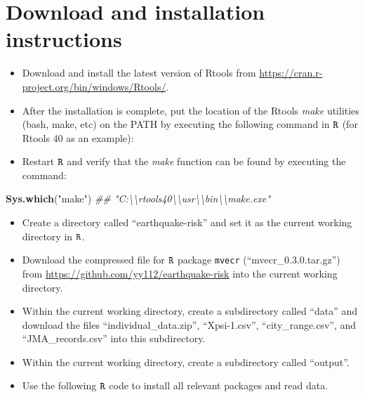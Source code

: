 \documentclass[
]{article}
\newenvironment{Shaded}{\begin{snugshade}}{\end{snugshade}}
\newcommand{\CharTok}[1]{\textcolor[rgb]{0.31,0.60,0.02}{#1}}
\newcommand{\CommentTok}[1]{\textcolor[rgb]{0.56,0.35,0.01}{\textit{#1}}}
\newcommand{\DataTypeTok}[1]{\textcolor[rgb]{0.13,0.29,0.53}{#1}}
\newcommand{\KeywordTok}[1]{\textcolor[rgb]{0.13,0.29,0.53}{\textbf{#1}}}
\newcommand{\NormalTok}[1]{#1}
\newcommand{\StringTok}[1]{\textcolor[rgb]{0.31,0.60,0.02}{#1}}
\providecommand{\tightlist}{%
  \setlength{\itemsep}{0pt}\setlength{\parskip}{0pt}}
\begin{document}
\hypertarget{download-and-installation-instructions}{%
\section{Download and installation
instructions}\label{download-and-installation-instructions}}

\begin{itemize}
\tightlist
\item
  Download and install the latest version of Rtools from
  \url{https://cran.r-project.org/bin/windows/Rtools/}.
\item
  After the installation is complete, put the location of the Rtools
  \emph{make} utilities (bash, make, etc) on the PATH by executing the
  following command in \(\tt{R}\) (for Rtools 40 as an example):
\end{itemize}

\begin{Shaded}
\end{Shaded}

\begin{itemize}
\tightlist
\item
  Restart \(\tt{R}\) and verify that the \emph{make} function can be
  found by executing the command:
\end{itemize}

\begin{Shaded}
\begin{Highlighting}[]
\KeywordTok{Sys.which}\NormalTok{(}\StringTok{"make"}\NormalTok{)}
\CommentTok{## "C:\textbackslash{}\textbackslash{}rtools40\textbackslash{}\textbackslash{}usr\textbackslash{}\textbackslash{}bin\textbackslash{}\textbackslash{}make.exe"}
\end{Highlighting}
\end{Shaded}

\begin{itemize}
\tightlist
\item
  Create a directory called ``earthquake-risk'' and set it as the
  current working directory in \(\tt{R}\).
\item
  Download the compressed file for \(\tt{R}\) package \texttt{mvecr}
  (``mvecr\_0.3.0.tar.gz'') from
  \url{https://github.com/yy112/earthquake-risk} into the current
  working directory.
\item
  Within the current working directory, create a subdirectory called
  ``data'' and download the files ``individual\_data.zip'',
  ``Xpsi-1.csv'', ``city\_range.csv'', and ``JMA\_records.csv'' into
  this subdirectory.
\item
  Within the current working directory, create a subdirectory called
  ``output''.
\item
  Use the following \(\tt{R}\) code to install all relevant packages and
  read data.
\end{itemize}
\end{document}

